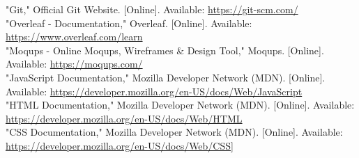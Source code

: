 \documentclass[conference]{IEEEtran}
\begin{document}
\begin{thebibliography}{00}
 "Git," Official Git Website. [Online]. Available: \url{https://git-scm.com/}\\
 "Overleaf - Documentation," Overleaf. [Online]. Available: \url{https://www.overleaf.com/learn}\\
 "Moqups - Online Moqups, Wireframes \& Design Tool," Moqups. [Online]. Available: \url{https://moqups.com/}\\
 "JavaScript Documentation," Mozilla Developer Network (MDN). [Online]. Available: \url{https://developer.mozilla.org/en-US/docs/Web/JavaScript}\\
 "HTML Documentation," Mozilla Developer Network (MDN). [Online]. Available: \url{https://developer.mozilla.org/en-US/docs/Web/HTML}\\
 "CSS Documentation," Mozilla Developer Network (MDN). [Online]. Available: \url{https://developer.mozilla.org/en-US/docs/Web/CSS]}\\
\end{thebibliography}
\end{document}
